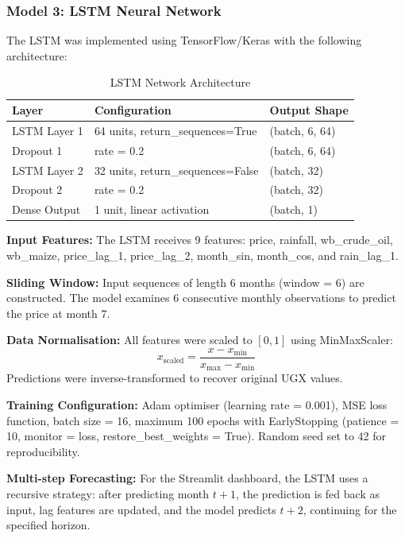 \documentclass[12pt,a4paper]{article}
\begin{document}
\subsubsection{Model 3: LSTM Neural Network}
The LSTM was implemented using TensorFlow/Keras with the following architecture:

\begin{table}[H]
\centering
\caption{LSTM Network Architecture}
\begin{tabular}{lll}
\toprule
\textbf{Layer} & \textbf{Configuration} & \textbf{Output Shape} \\
\midrule
LSTM Layer 1 & 64 units, return\_sequences=True & (batch, 6, 64) \\
Dropout 1 & rate = 0.2 & (batch, 6, 64) \\
LSTM Layer 2 & 32 units, return\_sequences=False & (batch, 32) \\
Dropout 2 & rate = 0.2 & (batch, 32) \\
Dense Output & 1 unit, linear activation & (batch, 1) \\
\bottomrule
\end{tabular}
\end{table}

\textbf{Input Features:} The LSTM receives 9 features: price, rainfall, wb\_crude\_oil, wb\_maize, price\_lag\_1, price\_lag\_2, month\_sin, month\_cos, and rain\_lag\_1.

\textbf{Sliding Window:} Input sequences of length 6 months (window = 6) are constructed. The model examines 6 consecutive monthly observations to predict the price at month 7.

\textbf{Data Normalisation:} All features were scaled to $[0, 1]$ using MinMaxScaler:
\begin{equation}
    x_{\text{scaled}} = \frac{x - x_{\min}}{x_{\max} - x_{\min}}
\end{equation}
Predictions were inverse-transformed to recover original UGX values.

\textbf{Training Configuration:} Adam optimiser (learning rate = 0.001), MSE loss function, batch size = 16, maximum 100 epochs with EarlyStopping (patience = 10, monitor = loss, restore\_best\_weights = True). Random seed set to 42 for reproducibility.

\textbf{Multi-step Forecasting:} For the Streamlit dashboard, the LSTM uses a recursive strategy: after predicting month $t+1$, the prediction is fed back as input, lag features are updated, and the model predicts $t+2$, continuing for the specified horizon.
\end{document}

